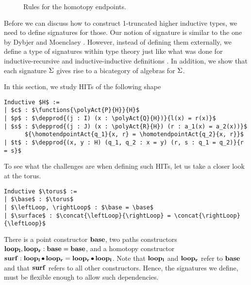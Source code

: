 \begin{figure*}
\vspace{5pt}

\begin{center}
\begin{bprooftree}
\end{bprooftree}
\end{center}

\caption{Rules for the homotopy endpoints.}
\label{fig:homot_ep}
\end{figure*}

Before we can discuss how to construct 1-truncated higher inductive types,
we need to define signatures for those.
Our notion of signature is similar to the one by Dybjer and Moenclaey \cite{DBLP:journals/entcs/DybjerM18}.
However, instead of defining them externally, we define a type of signatures within type theory
just like what was done for inductive-recursive and inductive-inductive
definitions \cite{Dybjer1999AFA,forsberg2012finite}. 
In addition, we show that each signature $\sign$ gives rise to a bicategory of algebras for $\sign$.

In this section, we study HITs of the following shape
\begin{lstlisting}[mathescape=true]
Inductive $H$ :=
| $c$ : $\functions{\polyAct{P}{H}}{H}$
| $p$ : $\depprod{(j : I) (x : \polyAct{Q}{H})}{l(x) = r(x)}$
| $s$ : $\depprod{(j : J) (x : \polyAct{R}{H}) (r : a_1(x) = a_2(x))}$
      ${\homotendpointAct{q_1}{x, r} = \homotendpointAct{q_2}{x, r}}$
| $t$ : $\depprod{(x, y : H) (q_1, q_2 : x = y) (r, s : q_1 = q_2)}{r = s}$
\end{lstlisting}
To see what the challenges are when defining such HITs, let us take a closer look at the torus.

\begin{lstlisting}[mathescape=true]
Inductive $\torus$ :=
| $\base$ : $\torus$
| $\leftLoop, \rightLoop$ : $\base = \base$
| $\surface$ : $\concat{\leftLoop}{\rightLoop} = \concat{\rightLoop}{\leftLoop}$
\end{lstlisting}

There is a point constructor $\base$, two paths constructors $\leftLoop, \rightLoop : \base = \base$,
and a homotopy constructor $\surface : \concat{\leftLoop}{\rightLoop} = \concat{\rightLoop}{\leftLoop}$.
Note that $\leftLoop$ and $\rightLoop$ refer to $\base$ and that $\surface$ refers to all other constructors.
Hence, the signatures we define, must be flexible enough to allow such dependencies.

